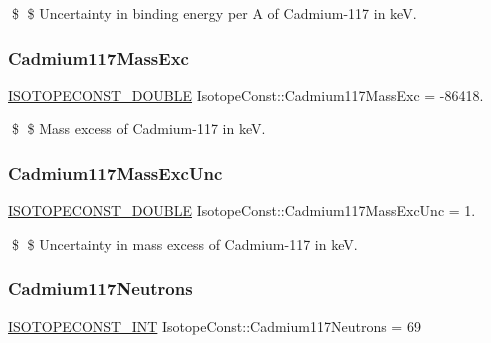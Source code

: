 \$ \$ Uncertainty in binding energy per A of Cadmium-\/117 in keV. \mbox{\label{group___isotope_const-_cadmium-_cd117_ga28ca716c97d09e109d03983aa5fc4d32}} 
\subsubsection{\texorpdfstring{Cadmium117\+Mass\+Exc}{Cadmium117MassExc}}
{\footnotesize\ttfamily \mbox{\hyperlink{group___isotope_const-_macros_ga8f45a7272ce02c0b4c65c44636ed719a}{I\+S\+O\+T\+O\+P\+E\+C\+O\+N\+S\+T\+\_\+\+D\+O\+U\+B\+LE}} Isotope\+Const\+::\+Cadmium117\+Mass\+Exc = -\/86418.}

\$ \$ Mass excess of Cadmium-\/117 in keV. \mbox{\label{group___isotope_const-_cadmium-_cd117_ga6eae578130da515764462be126e097b2}} 
\subsubsection{\texorpdfstring{Cadmium117\+Mass\+Exc\+Unc}{Cadmium117MassExcUnc}}
{\footnotesize\ttfamily \mbox{\hyperlink{group___isotope_const-_macros_ga8f45a7272ce02c0b4c65c44636ed719a}{I\+S\+O\+T\+O\+P\+E\+C\+O\+N\+S\+T\+\_\+\+D\+O\+U\+B\+LE}} Isotope\+Const\+::\+Cadmium117\+Mass\+Exc\+Unc = 1.}

\$ \$ Uncertainty in mass excess of Cadmium-\/117 in keV. \mbox{\label{group___isotope_const-_cadmium-_cd117_gaa5327584393ab71d2be53c435517352a}} 
\subsubsection{\texorpdfstring{Cadmium117\+Neutrons}{Cadmium117Neutrons}}
{\footnotesize\ttfamily \mbox{\hyperlink{group___isotope_const-_macros_ga5f18360b3e99483a35c32d789e62621c}{I\+S\+O\+T\+O\+P\+E\+C\+O\+N\+S\+T\+\_\+\+I\+NT}} Isotope\+Const\+::\+Cadmium117\+Neutrons = 69}

